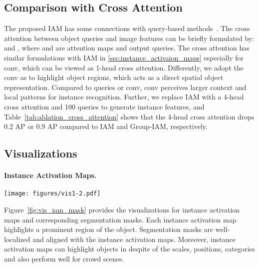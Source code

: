 \documentclass[10pt,twocolumn,letterpaper]{article}
\begin{document}
\subsection{Comparison with Cross Attention}
The proposed IAM has some connections with query-based methods~\cite{DETRCarionMSUKZ20,WangZAYC21MaxDeepLab,mask_former_abs-2107-06278,KNetabs-2106-14855}.
The cross attention between object queries  and image features  can be briefly formulated by:  and , where  and  are attention maps and output queries. The cross attention has similar formulations with IAM in \ref{sec:instance_activaion_maps} especially for  conv, which can be viewed as 1-head cross attention.
Differently, we adopt the  conv as  to highlight object regions, which acts as a direct spatial object representation.
Compared to queries or  conv,  conv perceives larger context and local patterns for instance recognition.
Further, we replace IAM with a 4-head cross attention and 100 queries to generate instance features, and Table~\ref{tab:ablation_cross_attention} shows that the 4-head cross attention drops 0.2 AP or 0.9 AP compared to IAM and Group-IAM, respectively.

\subsection{Visualizations}
\paragraph{Instance Activation Maps.}
\begin{figure*}[h]
    \centering
    \texttt{[image: figures/vis1-2.pdf]}
    \vspace{-5pt}
    \caption{\textbf{Visualizations for Instance Activation Maps.} We present the visualizations of the instance activation maps and segmentation masks. For each input image, the upper row shows the instance activation maps and the bottom row shows the corresponding segmentation masks. The instance activation maps tend to highlight the discriminative regions of the objects regardless of the scales, occlusion, and poses.
    Best viewed on screen after zooming in.}
    \label{fig:vis_iam_mask}
    \vspace{-5pt}
\end{figure*}
Figure~\ref{fig:vis_iam_mask} provides the visualizations for instance activation maps and corresponding segmentation masks. Each instance activation map highlights a prominent region of the object.
Segmentation masks are well-localized and aligned with the instance activation maps.
Moreover, instance activation maps can highlight objects in despite of the scales, positions, categories and also perform well for crowd scenes.
\end{document}
